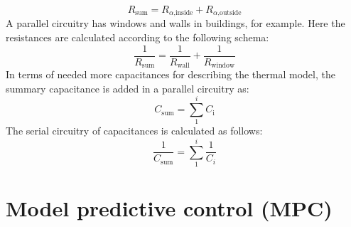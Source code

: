     \begin{equation}
    \label{eq:resistanceseriel}
        R_\text{sum} = R_{\alpha \text{,inside}} + R_{\alpha \text{,outside}}
    \end{equation}
    A parallel circuitry has windows and walls in buildings, for example. Here the resistances are calculated according to the following schema:
    \begin{equation}
    \label{eq:resistancesparallel}
        \frac{1}{R_\text{sum}} = \frac{1}{R_\text{wall}} + \frac{1}{R_\text{window}}
    \end{equation}
    In terms of needed more capacitances for describing the thermal model, the summary capacitance is added in a parallel circuitry as: 
    \begin{equation}
    \label{eq:capacityparallel}
        C_\text{sum} = \sum \limits_1^i C_\text{i} 
    \end{equation}
    The serial circuitry of capacitances is calculated as follows:
    \begin{equation}
    \label{eq:capacityseriell}
       \frac{1}{C_\text{sum}} = \sum \limits_1^i \frac{1}{C_i} 
    \end{equation}
    


\section{Model predictive control (MPC)}
\label{section:mpc}

